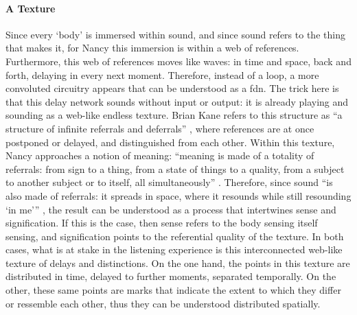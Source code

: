 \paragraph{A Texture}
Since every `body' is immersed within sound, and since sound refers to the thing that makes it, for Nancy this immersion is within a web of references. Furthermore, this web of references moves like waves: in time and space, back and forth, delaying in every next moment. Therefore, instead of a loop, a more convoluted circuitry appears that can be understood as a \gls{fdn}. The trick here is that this delay network sounds without input or output: it is already playing and sounding as a web-like endless texture. Brian Kane refers to this structure as ``a structure of infinite referrals and deferrals'' \parencite[143]{Gra15:The}, where references are at once postponed or delayed, and distinguished from each other. Within this texture, Nancy approaches a notion of meaning: ``meaning is made of a totality of referrals: from sign to a thing, from a state of things to a quality, from a subject to another subject or to itself, all simultaneously'' \parencite[4-9]{Nan07:Lis}. Therefore, since sound  ``is also made of referrals: it spreads in space, where it resounds while still resounding `in me''' \parencite[4-9]{Nan07:Lis}, the result can be understood as a process that intertwines sense and signification. If this is the case, then sense refers to the body sensing itself sensing, and signification points to the referential quality of the texture. In both cases, what is at stake in the listening experience is this interconnected web-like texture of delays and distinctions. On the one hand, the points in this texture are distributed in time, delayed to further moments, separated temporally. On the other, these same points are marks that indicate the extent to which they differ or ressemble each other, thus they can be understood distributed spatially.

